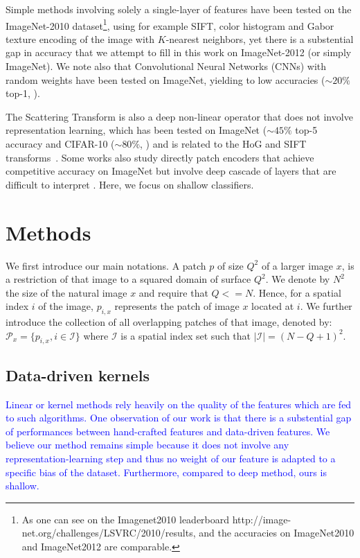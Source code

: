 \documentclass{article} %
\newcommand{\Edouard}[1]{\textcolor{blue}{#1}}
\begin{document}
Simple methods involving solely a single-layer of  features  have been tested on the ImageNet-2010 dataset\footnote{ As one can see on the Imagenet2010 leaderboard http://image-net.org/challenges/LSVRC/2010/results, and the accuracies on ImageNet2010 and ImageNet2012 are comparable.}, using for example SIFT, color histogram and Gabor texture encoding of the image with $K$-nearest neighbors, yet there is a substential gap in accuracy that we attempt to fill in this work on ImageNet-2012 (or simply ImageNet). We note also that Convolutional Neural Networks (CNNs) with random weights have been tested on ImageNet, yielding to low accuracies ($\sim 20\%$ top-1, \citep{arandjelovic2017look}).

The Scattering Transform \citep{mallat2012group} is also a deep non-linear operator that does not involve representation learning, which has been tested on ImageNet ($\sim 45\%$ top-5 accuracy \citep{zarka2019deep} and  CIFAR-10 ($\sim 80 \%$, \citep{Oyallon_2015_CVPR}) and is related to the HoG and SIFT transforms~\citep{Oyallon_2018_ECCV}.
Some works also study directly patch encoders that achieve competitive accuracy on ImageNet but involve deep cascade of layers that are difficult to interpret \citep{oyallon2017scaling,zarka2019deep,brendel2019approximating}. Here, we focus on shallow classifiers.

\section{Methods}




\label{method}
We first introduce our main notations. A patch $p$ of size $Q^2$ of a larger image $x$, is a  restriction of that image to a squared domain of surface $Q^2$. We denote by $N^2$ the size of the natural image $x$ and require that $Q<=N$. Hence, for a spatial index $i$ of the image,  $p_{i,x}$ represents the patch of image $x$ located at $i$.
We further introduce the collection of all overlapping patches of that image, denoted by: $\mathcal{P}_x=\{p_{i,x},i\in\mathcal{I}\}$ where $\mathcal{I}$ is a spatial index set such that $|\mathcal{I}|=(N-Q+1)
^2$. 

\subsection{Data-driven kernels}
\Edouard{Linear or kernel methods rely heavily on the quality of the features which are fed to such algorithms. One observation of our work is that there is a substential gap of performances between hand-crafted features and data-driven features. We believe our method remains simple because it does not involve any representation-learning step and thus no weight of our feature is adapted to a specific bias of the dataset. Furthermore, compared to deep method, ours is shallow.
}
\end{document}
